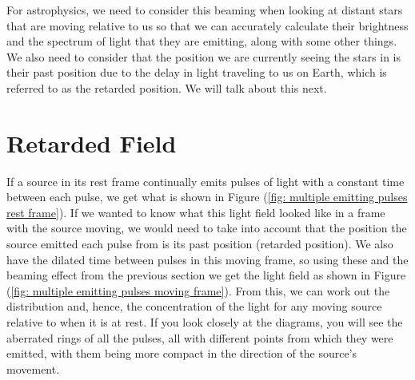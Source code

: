 For astrophysics, we need to consider this beaming when looking at distant stars that are moving relative to us so that we can accurately calculate their brightness and the spectrum of light that they are emitting, along with some other things.
We also need to consider that the position we are currently seeing the stars in is their past position due to the delay in light traveling to us on Earth, which is referred to as the retarded position.
We will talk about this next.

\section{Retarded Field} \label{sect: Retarded Field}

If a source in its rest frame continually emits pulses of light with a constant time between each pulse, we get what is shown in Figure (\ref{fig: multiple emitting pulses rest frame}).
If we wanted to know what this light field looked like in a frame with the source moving, we would need to take into account that the position the source emitted each pulse from is its past position (retarded position).
We also have the dilated time between pulses in this moving frame, so using these and the beaming effect from the previous section we get the light field as shown in Figure (\ref{fig: multiple emitting pulses moving frame}).
From this, we can work out the distribution and, hence, the concentration of the light for any moving source relative to when it is at rest.
If you look closely at the diagrams, you will see the aberrated rings of all the pulses, all with different points from which they were emitted, with them being more compact in the direction of the source's movement.

